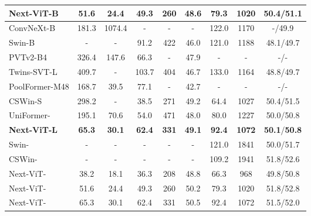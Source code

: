 \documentclass[10pt,twocolumn,letterpaper]{article}
\begin{document}
\begin{table*}[]
{\begin{tabular}{l|cc|ccc|ccc}
    \textbf{Next-ViT-B}          &\textbf{51.6}  & \textbf{24.4}      & \textbf{49.3}       &\textbf{260}        & \textbf{48.6}          & \textbf{79.3}      & \textbf{1020}       & \textbf{50.4}/\textbf{51.1}      \\   \midrule
    ConvNeXt-B\cite{ConvNext}                  &181.3  &1074.4    & -       & -        & -          & 122.0          & 1170          & -/49.9            \\       
    Swin-B\cite{Swin}            &-  &-    & 91.2       & 422        & 46.0          & 121.0      & 1188       & 48.1/49.7      \\
    PVTv2-B4\cite{PVT_v2}        &326.4 &  147.6  &66.3 &- &47.9          & -       & -        & -/-      \\
    Twins-SVT-L\cite{Twins}      &409.7  &-    & 103.7      & 404        & 46.7          & 133.0      & 1164       & 48.8/49.7      \\
    PoolFormer-M48\cite{metaformer}      &168.7    & 39.5       & 77.1  & -      & 42.7          & -          & -          & -/-            \\
    CSWin-S\cite{CSWin}          &298.2  & -    & 38.5       & 271        & 49.2          & 64.4       & 1027       & 50.4/51.5      \\
    UniFormer-\cite{uniformer} &195.1  &70.6    & 54.0       & 471        & 48.0          & 80.0     & 1227          & 50.0/50.8            \\
    
    \textbf{Next-ViT-L}          &\textbf{65.3}  &\textbf{30.1}     &\textbf{62.4}       & \textbf{331}       & \textbf{49.1}          & \textbf{92.4}      & \textbf{1072}       & \textbf{50.1}/\textbf{50.8} \\
    \midrule
    Swin-\cite{Swin}            &-  &-    & -       & -        & -          & 121.0      & 1841       & 50.0/51.7      \\
    CSWin-\cite{Swin}            &-  &-    & -       & -        & -          & 109.2      & 1941       & 51.8/52.6      \\
    Next-ViT-          &38.2  &18.1      &36.3       & 208        & 48.8         & 66.3      & 968       & 49.8/50.8      \\
    Next-ViT-          &51.6  & 24.4      & 49.3       &260        & 50.2          & 79.3      & 1020       & 51.8/52.8 \\
    Next-ViT-          &65.3  &30.1     &62.4       & 331       & 50.5          & 92.4      & 1072      & 51.5/52.0 \\
    \bottomrule
    \end{tabular}}
    \label{tab:ADE20K}
\end{table*}
\end{document}
